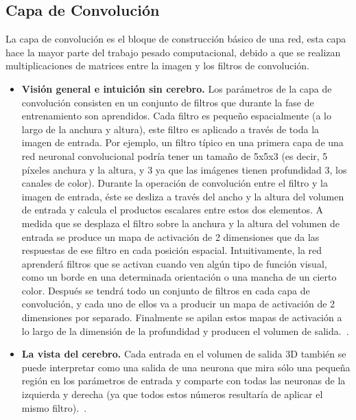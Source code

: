 \subsection{Capa de Convolución}
La capa de convolución es el bloque de construcción básico de una red, esta capa hace la mayor parte del trabajo pesado computacional, debido a que se realizan multiplicaciones de matrices entre la imagen y los filtros de convolución.
\begin{itemize}
\item \textbf{Visión general e intuición sin cerebro.} Los parámetros de la capa de convolución consisten en un conjunto de filtros que durante la fase de entrenamiento son aprendidos. Cada filtro es pequeño espacialmente (a lo largo de la anchura y altura), este filtro es aplicado a través de toda la imagen de entrada. Por ejemplo, un filtro típico en una primera capa de una red neuronal convolucional podría tener un tamaño de 5x5x3 (es decir, 5 píxeles anchura y la altura, y 3 ya que las imágenes tienen profundidad 3, los canales de color). Durante la operación de convolución entre el filtro y la imagen de entrada, éste se desliza a través del ancho y la altura del volumen de entrada y calcula el productos escalares entre estos dos elementos. A medida que se desplaza el filtro sobre la anchura y la altura del volumen de entrada se produce un mapa de activación de 2 dimensiones que da las respuestas de ese filtro en cada posición espacial. Intuitivamente, la red aprenderá filtros que se activan cuando ven algún tipo de función visual, como un borde en una determinada orientación o una mancha de un cierto color. Después se tendrá todo un conjunto de filtros en cada capa de convolución, y cada uno de ellos va a producir un mapa de activación de 2 dimensiones por separado. Finalmente se apilan estos mapas de activación a lo largo de la dimensión de la profundidad y producen el volumen de salida.~\cite{22RedesNeuronalesConvolu}.

\item \textbf{La vista del cerebro.} Cada entrada en el volumen de salida 3D también se puede interpretar como una salida de una neurona que mira sólo una pequeña región en los parámetros de entrada y comparte con todas las neuronas de la izquierda y derecha (ya que todos estos números resultaría de aplicar el mismo filtro).~\cite{22RedesNeuronalesConvolu}.


\end{itemize}
